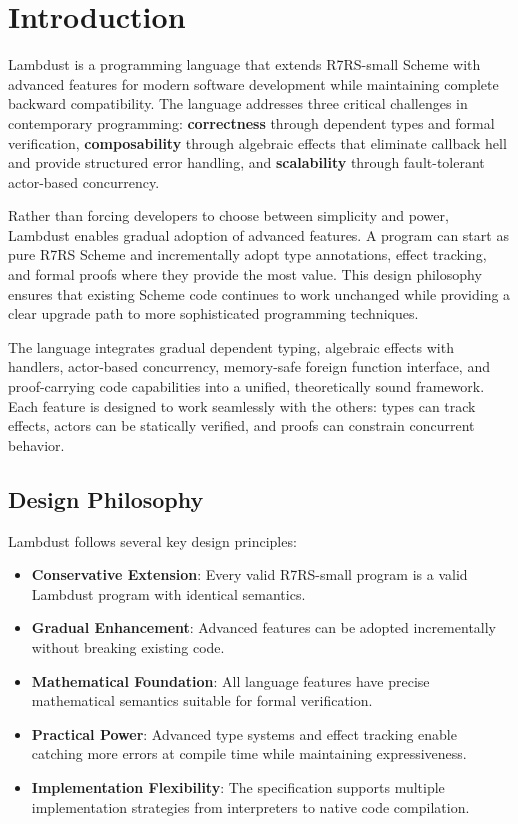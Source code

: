 \chapter{Introduction}
\label{ch:introduction}

Lambdust is a programming language that extends R7RS-small Scheme with advanced features for modern software development while maintaining complete backward compatibility. The language addresses three critical challenges in contemporary programming: \textbf{correctness} through dependent types and formal verification, \textbf{composability} through algebraic effects that eliminate callback hell and provide structured error handling, and \textbf{scalability} through fault-tolerant actor-based concurrency.

Rather than forcing developers to choose between simplicity and power, Lambdust enables gradual adoption of advanced features. A program can start as pure R7RS Scheme and incrementally adopt type annotations, effect tracking, and formal proofs where they provide the most value. This design philosophy ensures that existing Scheme code continues to work unchanged while providing a clear upgrade path to more sophisticated programming techniques.

The language integrates gradual dependent typing, algebraic effects with handlers, actor-based concurrency, memory-safe foreign function interface, and proof-carrying code capabilities into a unified, theoretically sound framework. Each feature is designed to work seamlessly with the others: types can track effects, actors can be statically verified, and proofs can constrain concurrent behavior.

\section{Design Philosophy}
\label{sec:philosophy}

Lambdust follows several key design principles:

\begin{itemize}
\item \textbf{Conservative Extension}: Every valid R7RS-small program is a valid Lambdust program with identical semantics.
\item \textbf{Gradual Enhancement}: Advanced features can be adopted incrementally without breaking existing code.
\item \textbf{Mathematical Foundation}: All language features have precise mathematical semantics suitable for formal verification.
\item \textbf{Practical Power}: Advanced type systems and effect tracking enable catching more errors at compile time while maintaining expressiveness.
\item \textbf{Implementation Flexibility}: The specification supports multiple implementation strategies from interpreters to native code compilation.
\end{itemize}


